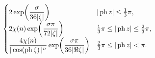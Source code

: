 \[\begin{cases}2\mathop{\exp\/}\nolimits\!\left(\dfrac{\sigma}{36|\zeta|}\right)%
&|\mathop{\mathrm{ph}\/}\nolimits z|\leq\tfrac{1}{3}\pi,\\
2\chi(n)\mathop{\exp\/}\nolimits\!\left(\dfrac{\sigma\pi}{72|\zeta|}\right)&%
\tfrac{1}{3}\pi\leq|\mathop{\mathrm{ph}\/}\nolimits z|\leq\tfrac{2}{3}\pi,\\
\dfrac{4\chi(n)}{|\mathop{\cos\/}\nolimits\!\left(\mathop{\mathrm{ph}\/}%
\nolimits\zeta\right)|^{n}}\mathop{\exp\/}\nolimits\!\left(\dfrac{\sigma\pi}{3%
6|\Re\zeta|}\right)&\tfrac{2}{3}\pi\leq|\mathop{\mathrm{ph}\/}\nolimits z|<\pi%
.\end{cases}\]